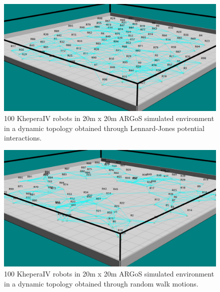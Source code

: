 \begin{figure}[htbp]
	\centering
    \includegraphics[width=\columnwidth]{images/argos_lennard.png}
    \caption[Lennard-Jones potential formation in ARGoS]{100 KheperaIV robots in 20m x 20m  ARGoS simulated environment in a dynamic topology obtained through Lennard-Jones potential interactions.}
    \label{argos:lennard-jones}
\end{figure}

\begin{figure}[htbp]
	\centering
    \includegraphics[width=\columnwidth]{images/argos_random.png}
    \caption[Random formation in ARGoS]{100 KheperaIV robots in 20m x 20m  ARGoS simulated environment in a dynamic topology obtained through random walk motions.}
    \label{argos:random-walk}
\end{figure}

